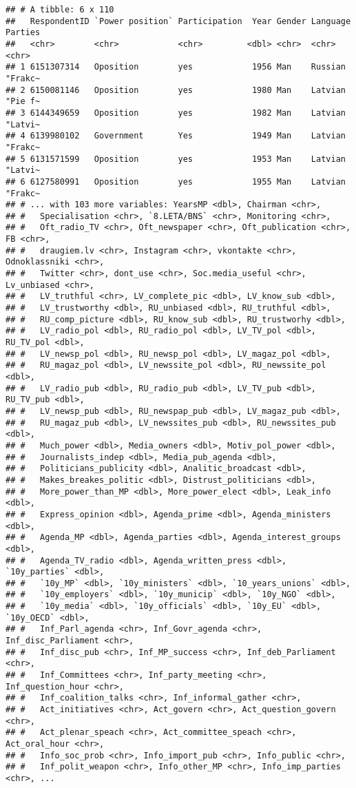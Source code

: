 \documentclass[
]{article}
\begin{document}
\begin{verbatim}
## # A tibble: 6 x 110
##   RespondentID `Power position` Participation  Year Gender Language Parties
##   <chr>        <chr>            <chr>         <dbl> <chr>  <chr>    <chr>  
## 1 6151307314   Oposition        yes            1956 Man    Russian  "Frakc~
## 2 6150081146   Oposition        yes            1980 Man    Latvian  "Pie f~
## 3 6144349659   Oposition        yes            1982 Man    Latvian  "Latvi~
## 4 6139980102   Government       Yes            1949 Man    Latvian  "Frakc~
## 5 6131571599   Oposition        yes            1953 Man    Latvian  "Latvi~
## 6 6127580991   Oposition        yes            1955 Man    Latvian  "Frakc~
## # ... with 103 more variables: YearsMP <dbl>, Chairman <chr>,
## #   Specialisation <chr>, `8.LETA/BNS` <chr>, Monitoring <chr>,
## #   Oft_radio_TV <chr>, Oft_newspaper <chr>, Oft_publication <chr>, FB <chr>,
## #   draugiem.lv <chr>, Instagram <chr>, vkontakte <chr>, Odnoklassniki <chr>,
## #   Twitter <chr>, dont_use <chr>, Soc.media_useful <chr>, Lv_unbiased <chr>,
## #   LV_truthful <chr>, LV_complete_pic <dbl>, LV_know_sub <dbl>,
## #   LV_trustworthy <dbl>, RU_unbiased <dbl>, RU_truthful <dbl>,
## #   RU_comp_picture <dbl>, RU_know_sub <dbl>, RU_trustworhy <dbl>,
## #   LV_radio_pol <dbl>, RU_radio_pol <dbl>, LV_TV_pol <dbl>, RU_TV_pol <dbl>,
## #   LV_newsp_pol <dbl>, RU_newsp_pol <dbl>, LV_magaz_pol <dbl>,
## #   RU_magaz_pol <dbl>, LV_newssite_pol <dbl>, RU_newssite_pol <dbl>,
## #   LV_radio_pub <dbl>, RU_radio_pub <dbl>, LV_TV_pub <dbl>, RU_TV_pub <dbl>,
## #   LV_newsp_pub <dbl>, RU_newspap_pub <dbl>, LV_magaz_pub <dbl>,
## #   RU_magaz_pub <dbl>, LV_newssites_pub <dbl>, RU_newssites_pub <dbl>,
## #   Much_power <dbl>, Media_owners <dbl>, Motiv_pol_power <dbl>,
## #   Journalists_indep <dbl>, Media_pub_agenda <dbl>,
## #   Politicians_publicity <dbl>, Analitic_broadcast <dbl>,
## #   Makes_breakes_politic <dbl>, Distrust_politicians <dbl>,
## #   More_power_than_MP <dbl>, More_power_elect <dbl>, Leak_info <dbl>,
## #   Express_opinion <dbl>, Agenda_prime <dbl>, Agenda_ministers <dbl>,
## #   Agenda_MP <dbl>, Agenda_parties <dbl>, Agenda_interest_groups <dbl>,
## #   Agenda_TV_radio <dbl>, Agenda_written_press <dbl>, `10y_parties` <dbl>,
## #   `10y_MP` <dbl>, `10y_ministers` <dbl>, `10_years_unions` <dbl>,
## #   `10y_employers` <dbl>, `10y_municip` <dbl>, `10y_NGO` <dbl>,
## #   `10y_media` <dbl>, `10y_officials` <dbl>, `10y_EU` <dbl>, `10y_OECD` <dbl>,
## #   Inf_Parl_agenda <chr>, Inf_Govr_agenda <chr>, Inf_disc_Parliament <chr>,
## #   Inf_disc_pub <chr>, Inf_MP_success <chr>, Inf_deb_Parliament <chr>,
## #   Inf_Committees <chr>, Inf_party_meeting <chr>, Inf_question_hour <chr>,
## #   Inf_coalition_talks <chr>, Inf_informal_gather <chr>,
## #   Act_initiatives <chr>, Act_govern <chr>, Act_question_govern <chr>,
## #   Act_plenar_speach <chr>, Act_committee_speach <chr>, Act_oral_hour <chr>,
## #   Info_soc_prob <chr>, Info_import_pub <chr>, Info_public <chr>,
## #   Inf_polit_weapon <chr>, Info_other_MP <chr>, Info_imp_parties <chr>, ...
\end{verbatim}
\end{document}
